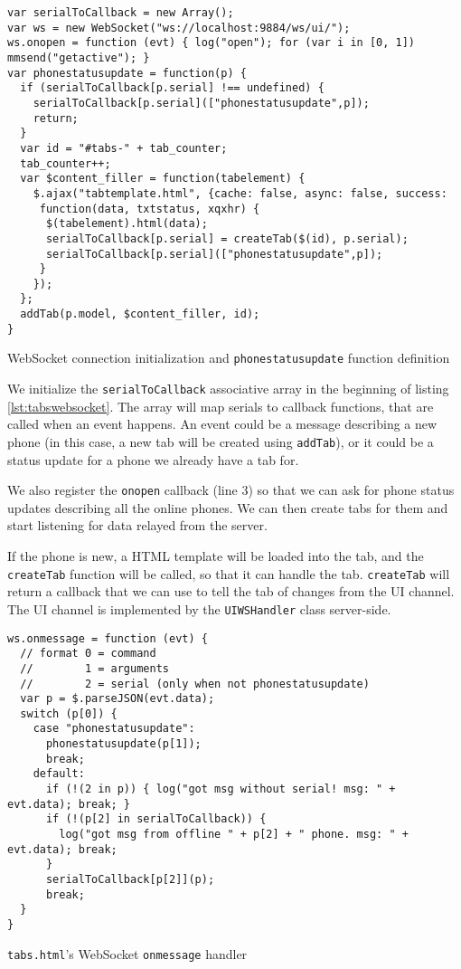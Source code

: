 \documentclass[a4paper]{report}
\newcommand{\classname}[1]{\texttt{#1}}
\newcommand{\methodname}[1]{\texttt{#1}}
\newcommand{\variable}[1]{\texttt{#1}}
\newcommand{\filename}[1]{\texttt{#1}}
\begin{document}
{\begin{listing}[H]
\begin{verbatim}
var serialToCallback = new Array();
var ws = new WebSocket("ws://localhost:9884/ws/ui/");
ws.onopen = function (evt) { log("open"); for (var i in [0, 1]) mmsend("getactive"); }
var phonestatusupdate = function(p) {
  if (serialToCallback[p.serial] !== undefined) {
    serialToCallback[p.serial](["phonestatusupdate",p]);
    return;
  }
  var id = "#tabs-" + tab_counter;
  tab_counter++;
  var $content_filler = function(tabelement) {
    $.ajax("tabtemplate.html", {cache: false, async: false, success: 
     function(data, txtstatus, xqxhr) {
      $(tabelement).html(data);
      serialToCallback[p.serial] = createTab($(id), p.serial);
      serialToCallback[p.serial](["phonestatusupdate",p]);
     }
    });
  };
  addTab(p.model, $content_filler, id);
}
\end{verbatim}
\caption{WebSocket connection initialization and \methodname{phonestatusupdate} function definition}
\label{lst:tabswebsocket}
\end{listing}

We initialize the \variable{serialToCallback} associative array in the beginning of listing \ref{lst:tabswebsocket}. The array will map serials to callback functions, that are called when an event happens. An event could be a message describing a new phone (in this case, a new tab will be created using \methodname{addTab}), or it could be a status update for a phone we already have a tab for.

We also register the \methodname{onopen} callback (line 3) so that we can ask for phone status updates describing all the online phones. We can then create tabs for them and start listening for data relayed from the server.

If the phone is new, a HTML template will be loaded into the tab, and the \methodname{createTab} function will be called, so that it can handle the tab. \methodname{createTab} will return a callback that we can use to tell the tab of changes from the UI channel. The UI channel is implemented by the \classname{UIWSHandler} class server-side.

\begin{listing}[H]
\begin{verbatim}
ws.onmessage = function (evt) {
  // format 0 = command
  //        1 = arguments
  //        2 = serial (only when not phonestatusupdate)
  var p = $.parseJSON(evt.data);
  switch (p[0]) {
    case "phonestatusupdate":
      phonestatusupdate(p[1]);
      break;
    default:
      if (!(2 in p)) { log("got msg without serial! msg: " + evt.data); break; }
      if (!(p[2] in serialToCallback)) {
        log("got msg from offline " + p[2] + " phone. msg: " + evt.data); break;
      }
      serialToCallback[p[2]](p);
      break;
  }
}
\end{verbatim}
\caption{\filename{tabs.html}'s WebSocket \methodname{onmessage} handler}
\label{lst:tabsonmessage}
\end{listing}

}
\end{document}
